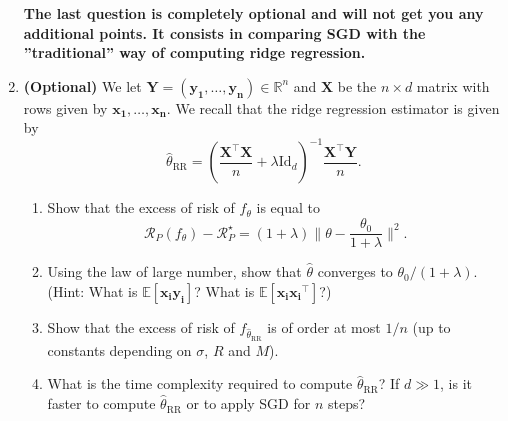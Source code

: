 \documentclass[12pt]{article}
\newcommand{\p}[1]{\left(#1 \right)}
\renewcommand{\b}[1]{\mathbf{#1 }}
\newcommand{\Id}{\mathrm{Id}}
\newcommand{\E}{\mathbb{E}}
\newcommand{\R}{\mathbb{R}}
\newcommand{\RR}{\mathcal{R}}
\begin{document}
\begin{enumerate}
\textbf{The last question is completely optional and will not get you any additional points. It consists in comparing SGD with the ''traditional'' way of computing ridge regression.}

\item \textbf{(Optional)} We let $\b{Y}=(\b{y_1},\dots,\b{y_n})\in \R^n$ and $\b{X}$  be the $n\times d$ matrix with rows given by $\b{x_1},\dots,\b{x_n}$. We recall that the ridge regression estimator is
 given by
\[ \hat \theta_{\mathrm{RR}} = \p{\frac{\b{X}^\top \b{X}}{n} + \lambda  \Id_d}^{-1} \frac{\b{X}^\top \b{Y}}{n}.\]
\begin{enumerate}
\item Show that the excess of risk of $f_\theta$ is equal to
\[ \RR_P(f_\theta)-\RR_P^\star = (1+\lambda) \|\theta-\frac{\theta_0}{1+\lambda}\|^2.\]
\item Using the law of large number, show that $\hat \theta$ converges to $\theta_0/(1+\lambda)$. (Hint: What is $\E[\b{x_i}\b{y_i}]$? What is $\E[\b{x_i}\b{x_i}^\top]$?)
\item Show that the excess of risk of $f_{\hat \theta_{\mathrm{RR}}}$ is of order at most $1/n$ (up to constants depending on $\sigma$, $R$ and $M$).
\item What is the time complexity required to compute $\hat \theta_{\mathrm{RR}}$? If $d\gg 1$, is it faster to compute $\hat \theta_{\mathrm{RR}}$ or to apply SGD for $n$ steps?
\end{enumerate}


\end{enumerate}
\end{document}
